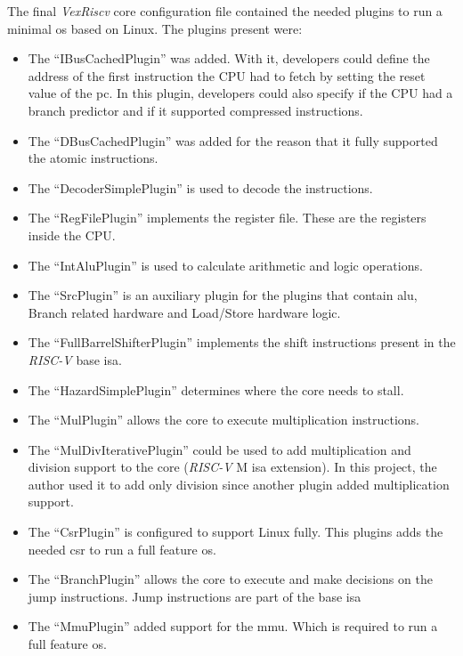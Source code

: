 The final \textit{VexRiscv} core configuration file contained the needed plugins to run a minimal \acrfull{os} based on Linux. The plugins present were:
\begin{itemize}
  \item The \enquote{IBusCachedPlugin} was added. With it, developers could define the address of the first instruction the CPU had to fetch by setting the reset value of the \acrfull{pc}. In this plugin, developers could also specify if the CPU had a branch predictor and if it supported compressed instructions. 
  \item The \enquote{DBusCachedPlugin} was added for the reason that it fully supported the atomic instructions.
  \item The \enquote{DecoderSimplePlugin} is used to decode the instructions.
  \item The \enquote{RegFilePlugin} implements the register file. These are the registers inside the CPU.
  \item The \enquote{IntAluPlugin} is used to calculate arithmetic and logic operations.
  \item The \enquote{SrcPlugin} is an auxiliary plugin for the plugins that contain \acrfull{alu}, Branch related hardware and Load/Store hardware logic.
  \item The \enquote{FullBarrelShifterPlugin} implements the shift instructions present in the \textit{RISC-V} base \acrfull{isa}.
  \item The \enquote{HazardSimplePlugin} determines where the core needs to stall.
  \item The \enquote{MulPlugin} allows the core to execute multiplication instructions.
  \item The \enquote{MulDivIterativePlugin} could be used to add multiplication and division support to the core (\textit{RISC-V} M \acrshort{isa} extension). In this project, the author used it to add only division since another plugin added multiplication support.
  \item The \enquote{CsrPlugin} is configured to support Linux fully. This plugins adds the needed \acrfull{csr} to run a full feature \acrshort{os}.
  \item The \enquote{BranchPlugin} allows the core to execute and make decisions on the jump instructions. Jump instructions are part of the base \acrfull{isa}
  \item The \enquote{MmuPlugin} added support for the \acrfull{mmu}. Which is required to run a full feature \acrshort{os}.
\end{itemize}

